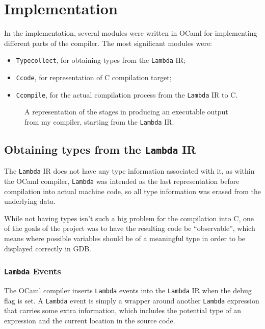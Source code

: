 \documentclass[12pt,a4paper,twoside,openright]{report}
\begin{document}
\chapter{Implementation}

In the implementation, several modules were written in OCaml 
for implementing different parts of the compiler. The most significant modules 
were:

\begin{itemize}
\item \texttt{Typecollect}, for obtaining types from the \texttt{Lambda} IR;
\item \texttt{Ccode}, for representation of C compilation target;
\item \texttt{Ccompile}, for the actual compilation process from the 
\texttt{Lambda} IR to C.
\end{itemize}

\begin{figure}
    \centering
    
    \caption{A representation of the stages in producing an executable output
    from my compiler, starting from the \texttt{Lambda} IR.}
    \label{fig:compilerpipeline}
\end{figure}

\section{Obtaining types from the \texttt{Lambda} IR} \label{lambda-types}

The \texttt{Lambda} IR does not have any type information associated with it, as
within the OCaml compiler, \texttt{Lambda} was intended as the last
representation before compilation into actual machine code, so all type
information was erased from the underlying data.

While not having types isn't such a big problem for the compilation into C, one
of the goals of the project was to have the resulting code be ``observable'',
which means where possible variables should be of a meaningful type in order to
be displayed correctly in GDB.

\subsection{\texttt{Lambda} Events} \label{levents}

The OCaml compiler inserts \texttt{Lambda} events into the \texttt{Lambda} IR
when the debug flag is set. A \texttt{Lambda} event is simply a wrapper around
another \texttt{Lambda} expression that carries some extra information, which
includes the potential type of an expression and the current location in the
source code.
\end{document}
